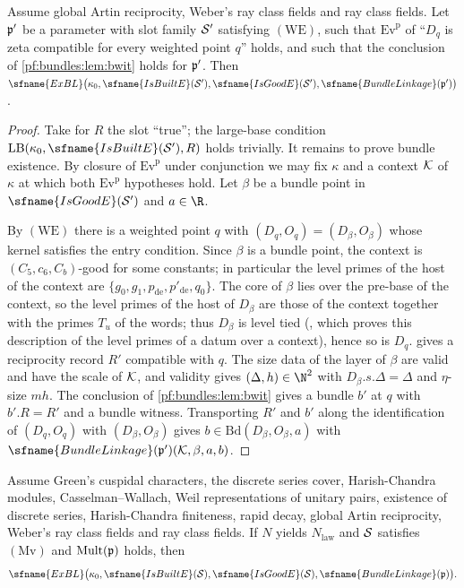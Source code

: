 \begin{lemma}\label{pf:bundles:lem:exblred}
Assume global Artin reciprocity, Weber's ray class fields and ray class fields. Let $\mathfrak p'$ be a parameter with slot family $\mathcal S'$
satisfying $(\mathrm{WE})$, such that $\mathrm{Ev}^{\mathrm p}$ of ``$D_q$ is zeta compatible for every weighted point $q$'' holds, and
such that the conclusion of \cref{pf:bundles:lem:bwit} holds for $\mathfrak p'$. Then $\sfname{ExBL}\bigl(\kappa_0,\sfname{IsBuiltE}(\bundS'),
\sfname{IsGoodE}(\bundS'),\sfname{BundleLinkage}(\bundp')\bigr)$.
\end{lemma}

\begin{proof}
Take for $R$ the slot ``true''; the large-base condition $\mathrm{LB}(\kappa_0,\sfname{IsBuiltE}(\bundS'),R)$ holds trivially. It remains
to prove bundle existence. By closure of $\mathrm{Ev}^{\mathrm p}$ under conjunction we may fix $\kappa$ and a context $\mathcal K$ of $\kappa$
at which both $\mathrm{Ev}^{\mathrm p}$ hypotheses hold. Let $\beta$ be a bundle point in $\sfname{IsGoodE}(\bundS')$ and $a\in\R$.

By $(\mathrm{WE})$ there is a weighted point $q$ with $(D_q,O_q)=(D_\beta,O_\beta)$ whose kernel satisfies the entry condition. Since
$\beta$ is a bundle point, the context is $(C_5,c_6,C_b)$-good for some constants; in particular the level primes of the host of the context are
$\{g_0,g_1,p_{\mathrm{de}},p'_{\mathrm{de}},q_0\}$. The core of $\beta$ lies over the pre-base of the context, so the level primes of the host of
$D_\beta$ are those of the context together with the primes $T_u$ of the words; thus $D_\beta$ is level tied
(, which proves this description of the level primes of a datum over a context), hence so is
$D_q$.  gives a
reciprocity record $R'$ compatible with $q$. The size data of the layer of $\beta$ are valid and have the scale of $\mathcal K$, and validity
gives $(\Delta,h)\in\N^2$ with $D_\beta.s.\Delta=\Delta$ and $\eta$-size $mh$. The conclusion of \cref{pf:bundles:lem:bwit} gives a
bundle $b'$ at $q$ with $b'.R=R'$ and a bundle witness. Transporting $R'$ and $b'$ along the identification of $(D_q,O_q)$ with
$(D_\beta,O_\beta)$ gives $b\in\mathrm{Bd}(D_\beta,O_\beta,a)$ with $\sfname{BundleLinkage}(\bundp')(\bundK,\beta,a,b)$.
\end{proof}

\begin{proposition}\label{pf:bundles:prop:exbl}
Assume Green's cuspidal characters, the discrete series cover, Harish-Chandra modules, Casselman--Wallach, Weil representations of
unitary pairs, existence of discrete series, Harish-Chandra finiteness, rapid decay, global Artin reciprocity, Weber's ray class fields
and ray class fields. If $N$ yields $N_{\mathrm{law}}$ and $\mathcal S$ satisfies $(\mathrm{Mv})$ and $\mathrm{Mult}(\mathfrak p)$ holds, then
\[
\sfname{ExBL}\bigl(\kappa_0,\sfname{IsBuiltE}(\bundS),\sfname{IsGoodE}(\bundS),\sfname{BundleLinkage}(\bundp)\bigr).
\]
\end{proposition}

